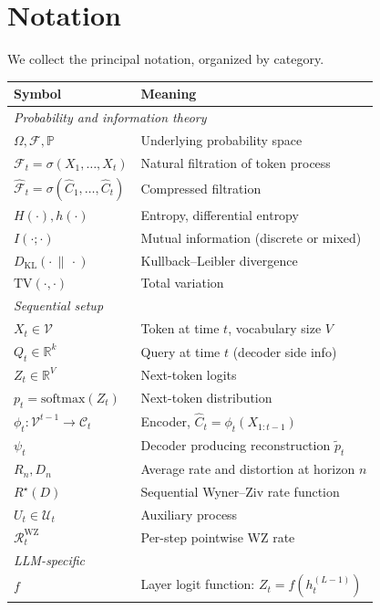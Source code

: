 \documentclass[11pt]{article}
\newcommand{\V}{\mathcal{V}}
\newcommand{\Prob}{\mathbb{P}}
\newcommand{\R}{\mathbb{R}}
\newcommand{\F}{\mathcal{F}}
\newcommand{\Fhat}{\hat{\F}}
\newcommand{\Chat}{\hat{C}}
\newcommand{\KL}[2]{D_{\mathrm{KL}}(#1 \,\|\, #2)}
\theoremstyle{plain}
\theoremstyle{definition}
\theoremstyle{remark}
\begin{document}
\section{Notation}\label{app:notation}

We collect the principal notation, organized by category.

\begin{table}[ht]
\centering
\renewcommand{\arraystretch}{1.15}
\small
\begin{tabular}{ll}
\toprule
\textbf{Symbol} & \textbf{Meaning} \\
\midrule
\multicolumn{2}{l}{\emph{Probability and information theory}} \\
$\Omega, \F, \Prob$ & Underlying probability space \\
$\F_t = \sigma(X_1, \ldots, X_t)$ & Natural filtration of token process \\
$\Fhat_t = \sigma(\Chat_1, \ldots, \Chat_t)$ & Compressed filtration \\
$H(\cdot), h(\cdot)$ & Entropy, differential entropy \\
$I(\cdot;\cdot)$ & Mutual information (discrete or mixed) \\
$\KL{\cdot}{\cdot}$ & Kullback--Leibler divergence \\
$\mathrm{TV}(\cdot, \cdot)$ & Total variation \\
\midrule
\multicolumn{2}{l}{\emph{Sequential setup}} \\
$X_t \in \V$ & Token at time $t$, vocabulary size $V$ \\
$Q_t \in \R^k$ & Query at time $t$ (decoder side info) \\
$Z_t \in \R^V$ & Next-token logits \\
$p_t = \mathrm{softmax}(Z_t)$ & Next-token distribution \\
$\phi_t : \V^{t-1} \to \mathcal{C}_t$ & Encoder, $\Chat_t = \phi_t(X_{1:t-1})$ \\
$\psi_t$ & Decoder producing reconstruction $\tilde p_t$ \\
$R_n, D_n$ & Average rate and distortion at horizon $n$ \\
$R^\star(D)$ & Sequential Wyner--Ziv rate function \\
$U_t \in \mathcal{U}_t$ & Auxiliary process \\
$\mathcal{R}_t^{\mathrm{WZ}}$ & Per-step pointwise WZ rate \\
\midrule
\multicolumn{2}{l}{\emph{LLM-specific}} \\
$f$ & Layer logit function: $Z_t = f(h_t^{(L-1)})$ \\

\end{tabular}
\end{table}
\end{document}
